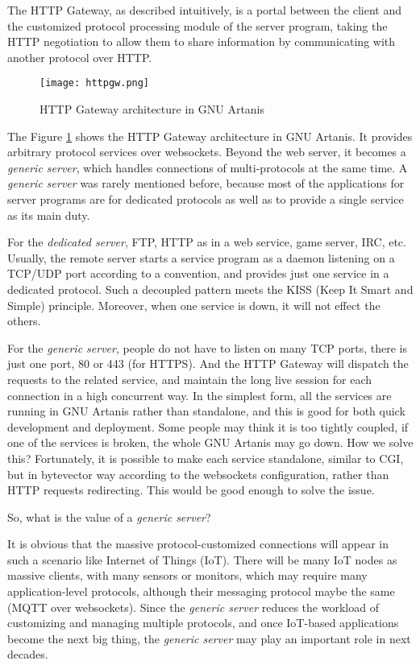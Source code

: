 \documentclass[numbers,numberedpars]{sigplanconf}
\begin{document}
The HTTP Gateway, as described intuitively, is a portal between the client and the customized protocol processing module of the server program, taking the HTTP negotiation to allow them to share information by communicating with another protocol over HTTP.

\begin{figure}[tbph]
  \centering
  \texttt{[image: httpgw.png]}
  \caption{HTTP Gateway architecture in GNU Artanis}
  \label{fig:httpgw}
\end{figure}

The Figure \ref{fig:httpgw} shows the HTTP Gateway architecture in GNU Artanis.
It provides arbitrary protocol services over websockets. Beyond the web server, it becomes a {\it generic server}, which handles connections of multi-protocols at the
same time. A {\it generic server} was rarely mentioned before, because most of the applications for server programs are for dedicated protocols as well as to provide a single service as its main duty.

For the {\it dedicated server}, FTP, HTTP as in a web service, game server, IRC, etc. Usually, the remote server starts a service program as a daemon listening on a TCP/UDP port according to a convention, and provides just one service in a dedicated protocol. Such a decoupled pattern meets the KISS (Keep It Smart and Simple) principle. Moreover, when one service is down, it will not effect the others.

For the {\it generic server}, people do not have to listen on many TCP ports, there is just one port, 80 or 443 (for HTTPS). And the HTTP Gateway will dispatch the requests to the related service, and maintain the long live session for each connection in a high concurrent way.
In the simplest form, all the services are running in GNU Artanis rather than standalone, and this is good for both quick development and deployment.
Some people may think it is too tightly coupled, if one of the services is broken, the whole GNU Artanis may go down. How we solve this?
Fortunately, it is possible to make each service standalone, similar to CGI, but in bytevector way according to the websockets configuration, rather than HTTP requests redirecting. This would be good enough to solve the issue.

So, what is the value of a {\it generic server}?

It is obvious that the massive protocol-customized connections will appear in such a scenario like Internet of Things (IoT).
There will be many IoT nodes as massive clients, with many sensors or monitors, which may require many application-level protocols, although their messaging protocol maybe the same (MQTT over websockets). Since the {\it generic server} reduces the workload of customizing and managing multiple protocols, and once IoT-based applications become the next big thing, the {\it generic server} may play an important role in next decades. 
\end{document}

